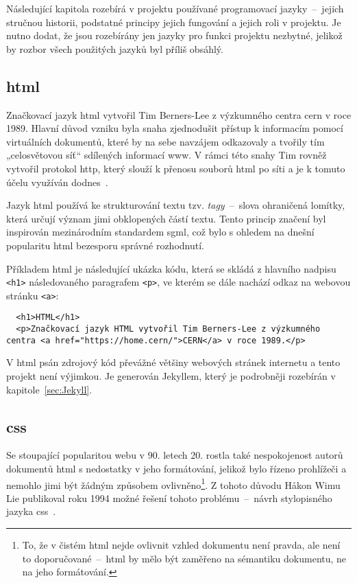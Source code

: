 \documentclass[a4paper, 12pt]{article}
\begin{document}
  Následující kapitola rozebírá v projektu používané programovací jazyky~--~jejich stručnou historii, podstatné principy jejich fungování a jejich roli v projektu. Je nutno dodat, že jsou rozebírány jen jazyky pro funkci projektu nezbytné, jelikož by rozbor všech použitých jazyků byl příliš obsáhlý.


  \subsection{\acrshort{html}} \label{sec:HTML}
  Značkovací jazyk \gls{html} vytvořil Tim Berners-Lee z výzkumného centra \gls{cern} v roce 1989. Hlavní důvod vzniku byla snaha zjednodušit přístup k informacím pomocí virtuálních dokumentů, které by na sebe navzájem odkazovaly a tvořily tím „celosvětovou síť“ sdílených informací \gls{www}. V rámci této snahy Tim rovněž vytvořil protokol \gls{http}, který slouží k přenosu souborů \gls{html} po síti a je k tomuto účelu využíván dodnes~\cite{html-history}.

  Jazyk \gls{html} používá ke strukturování textu tzv. \emph{tagy}~--~slova ohraničená lomítky, která určují význam jimi obklopených částí textu. Tento princip značení byl inspirován mezinárodním standardem \gls{sgml}, což bylo s ohledem na dnešní popularitu \gls{html} bezesporu správné rozhodnutí.

  Příkladem \gls{html} je následující ukázka kódu, která se skládá z hlavního nadpisu \texttt{<h1>} následovaného paragrafem \texttt{<p>}, ve kterém se dále nachází odkaz na webovou stránku \texttt{<a>}:

  \begin{verbatim}
  <h1>HTML</h1>
  <p>Značkovací jazyk HTML vytvořil Tim Berners-Lee z výzkumného centra <a href="https://home.cern/">CERN</a> v roce 1989.</p>
  \end{verbatim}

  V \gls{html} psán zdrojový kód převážné většiny webových stránek internetu a tento projekt není výjimkou. Je generován Jekyllem, který je podrobněji rozebírán v kapitole~\ref{sec:Jekyll}.


  \subsection{\acrshort{css}} \label{sec:CSS}
  Se stoupající popularitou webu v 90. letech 20. rostla také nespokojenost autorů dokumentů \gls{html} s nedostatky v jeho formátování, jelikož bylo řízeno prohlížeči a nemohlo jimi být žádným způsobem ovlivněno\footnote{To, že v čistém \gls{html} nejde ovlivnit vzhled dokumentu není pravda, ale není to doporučované~--~\gls{html} by mělo být zaměřeno na sémantiku dokumentu, ne na jeho formátování.}. Z tohoto důvodu Håkon Wimu Lie publikoval roku 1994 možné řešení tohoto problému~--~návrh stylopisného jazyka \gls{css}~\cite{css-proposal,css-saga}.
\end{document}
